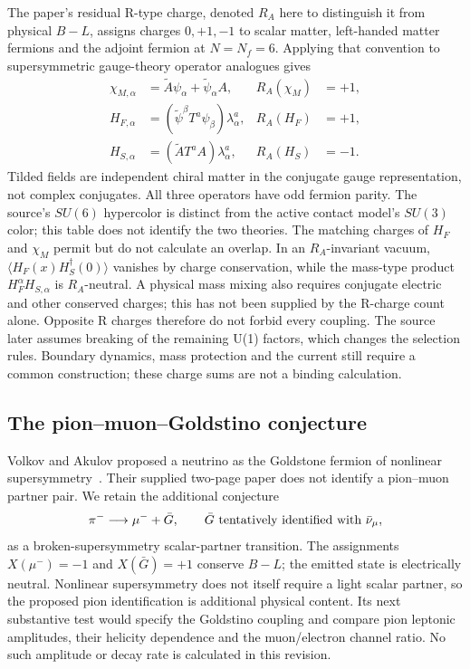 The paper's residual R-type charge, denoted $R_A$ here to distinguish it from
physical $B-L$, assigns charges $0,+1,-1$ to scalar matter, left-handed matter
fermions and the adjoint fermion at $N=N_f=6$. Applying that convention to
supersymmetric gauge-theory operator analogues gives
\begin{align}
 \chi_{M,\alpha}&=\widetilde A\psi_\alpha+\widetilde\psi_\alpha A,
 &R_A(\chi_M)&=+1,\\
 H_{F,\alpha}&=(\widetilde\psi^\beta T^a\psi_\beta)\lambda^a_\alpha,
 &R_A(H_F)&=+1,\\
 H_{S,\alpha}&=(\widetilde A T^a A)\lambda^a_\alpha,
 &R_A(H_S)&=-1.
\end{align}
Tilded fields are independent chiral matter in the conjugate gauge
representation, not complex conjugates. All three operators have odd
fermion parity. The source's $SU(6)$ hypercolor is distinct from the active
contact model's $SU(3)$ color; this table does not identify the two theories.
The matching charges of $H_F$ and $\chi_M$ permit but do not calculate an
overlap. In an $R_A$-invariant vacuum,
$\langle H_F(x)H_S^\dagger(0)\rangle$ vanishes by charge conservation,
while the mass-type product $H_F^\alpha H_{S,\alpha}$ is $R_A$-neutral.
A physical mass mixing also requires conjugate electric and other conserved
charges; this has not been supplied by the R-charge count alone.
Opposite R charges therefore do not forbid every coupling. The source later
assumes breaking of the remaining U(1) factors, which changes the selection
rules. Boundary dynamics, mass protection and the current still require a
common construction; these charge sums are not a binding calculation.

\subsection{The pion--muon--Goldstino conjecture}
Volkov and Akulov proposed a neutrino as the Goldstone fermion of nonlinear
supersymmetry~\cite{VolkovAkulov}. Their supplied two-page paper does not
identify a pion--muon partner pair. We retain the additional conjecture
\begin{equation}
 \pi^-\longrightarrow\mu^-+\bar G,
 \qquad \bar G\ \hbox{tentatively identified with }\bar\nu_\mu,
\end{equation}
as a broken-supersymmetry scalar-partner transition. The assignments
$X(\mu^-)=-1$ and $X(\bar G)=+1$ conserve $B-L$; the emitted state is
electrically neutral. Nonlinear supersymmetry does not itself require a light
scalar partner, so the proposed pion identification is additional physical
content. Its next substantive test would specify the Goldstino coupling and
compare pion leptonic amplitudes, their helicity dependence and the
muon/electron channel ratio. No such amplitude or decay rate is calculated
in this revision.
